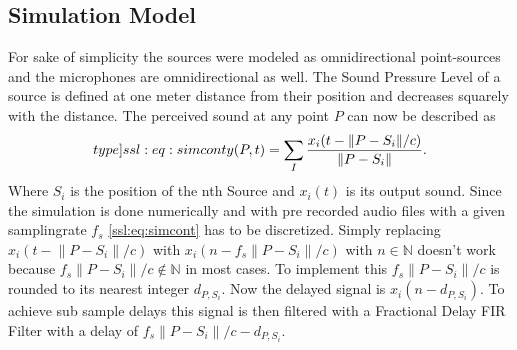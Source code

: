 \subsection{Simulation Model}
For sake of simplicity the sources were modeled as omnidirectional point-sources and the 
microphones are omnidirectional as well.
The Sound Pressure Level of a source is defined at one meter distance from their position and decreases 
squarely with the distance.
The perceived sound at any point $P$ can now be described as
\begin{equation}
  \label[type]{ssl:eq:simcont}
  y(P, t) = \sum_{I} \frac{x_i(t - \lVert P - S_i\rVert/c)}{\lVert P - S_i\rVert}.
\end{equation}
Where $S_i$ is the position of the nth Source and $x_i(t)$ is its output sound.
Since the simulation is done numerically and with pre recorded audio files with a given
samplingrate $f_s$ \eqref{ssl:eq:simcont} has to be discretized.
Simply replacing $x_i(t - \lVert P - S_i\rVert/c)$ with 
$x_i(n - f_s \lVert P - S_i\rVert/c)$ with
$n \in \mathbb{N}$ doesn't work because 
$f_s \lVert P - S_i\rVert/c \not \in \mathbb{N}$ in most cases.
To implement this $f_s \lVert P - S_i\rVert/c$ is rounded to
its nearest integer $d_{P,S_i}$.
Now the delayed signal is $x_i(n - d_{P,S_i})$.
To achieve sub sample delays this signal is then filtered
with a Fractional Delay FIR Filter with a delay of 
$f_s \lVert P - S_i\rVert/c - d_{P,S_i}$.


